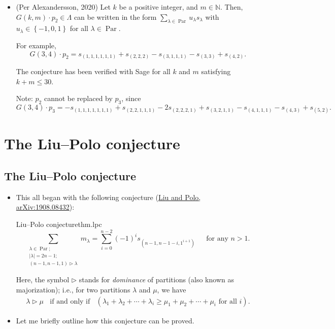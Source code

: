 \documentclass[numbers=enddot,12pt,final,onecolumn,notitlepage]{scrartcl}%
\newcommand{\Par}{\operatorname{Par}}
\newcommand{\defn}[1]{{\color{darkred}\emph{#1}}}
\newcommand{\0}{\phantom{c}}
\let\sumnonlimits\sum
\renewcommand{\sum}{\sumnonlimits\limits}
\newcommand{\nowbox}{\hphantom{x} \vspace{-1.5pc}}
\begin{document}
\begin{itemize}

\item \nowbox
\begin{conjecture}{(Per Alexandersson, 2020)}{}
Let $k$ be a positive integer, and $m\in\mathbb{N}$. Then,
$G\left(  k,m\right)  \cdot p_{2}\in\Lambda$ can be written in the form
$\sum_{\lambda\in\operatorname*{Par}}u_{\lambda}s_{\lambda}$ with $u_{\lambda
}\in\left\{  -1,0,1\right\}  $ for all $\lambda\in\operatorname*{Par}$.
\end{conjecture}

For example,%
\[
G\left(  3,4\right)  \cdot p_{2}=s_{\left(  1,1,1,1,1,1\right)  }+s_{\left(
2,2,2\right)  }-s_{\left(  3,1,1,1\right)  }-s_{\left(  3,3\right)
}+s_{\left(  4,2\right)  }.
\]

The conjecture has been verified with Sage for all $k$ and $m$ satisfying
$k+m\leq30$.

Note: $p_2$ cannot be replaced by $p_3$, since
\[
G\left(  3,4\right)  \cdot p_{3}=-s_{\left(  1,1,1,1,1,1,1\right)
}+s_{\left(  2,2,1,1,1\right)  }-2s_{\left(  2,2,2,1\right)  }+s_{\left(
3,2,1,1\right)  }-s_{\left(  4,1,1,1\right)  }-s_{\left(  4,3\right)
}+s_{\left(  5,2\right)  }.
\]

\end{itemize}

\section{The Liu--Polo conjecture}

\subsection{The Liu--Polo conjecture}

\begin{itemize}
\item This all began with the following conjecture
(\href{https://arxiv.org/abs/1908.08432}{Liu and Polo, arXiv:1908.08432}):%
\begin{theorem}{Liu--Polo conjecture}{thm.lpc}
\[
\sum_{\substack{\lambda\in\Par;\\ \left|\lambda\right| = 2n-1;\\\left(
n-1,n-1,1\right)  \triangleright\lambda}}m_{\lambda}=\sum_{i=0}^{n-2}\left(
-1\right)  ^{i}s_{\left(  n-1,n-1-i,1^{i+1}\right)  }\ \ \ \ \ \ \ \text{for
any }n>1.
\]
\end{theorem}
Here, the symbol $\triangleright$ stands for \defn{dominance} of partitions
(also known as majorization); i.e., for two partitions $\lambda$ and $\mu$, we
have
\begin{align*}
 \lambda\triangleright\mu\ \ \ \ \text{if and only if}\ \ \ \ %
 \left(  \lambda_{1}+\lambda_{2}+\cdots+\lambda_{i}\geq\mu_{1}+\mu
_{2}+\cdots+\mu_{i}\text{ for all }i\right)  .
\end{align*}


\item Let me briefly outline how this conjecture can be proved.
\end{itemize}
\end{document}
